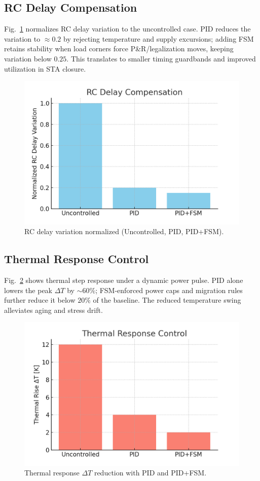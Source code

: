 \documentclass[conference]{IEEEtran}
\begin{document}
\subsection{RC Delay Compensation}
Fig.~\ref{fig:rc} normalizes RC delay variation to the uncontrolled case. PID reduces the variation to $\approx 0.2$ by rejecting temperature and supply excursions; adding FSM retains stability when load corners force P\&R/legalization moves, keeping variation below $0.25$. This translates to smaller timing guardbands and improved utilization in STA closure.

\begin{figure}[t]
\centering
\includegraphics[width=0.95\linewidth]{figs/sim_delay_rc.png}
\caption{RC delay variation normalized (Uncontrolled, PID, PID+FSM).}
\label{fig:rc}
\end{figure}

\subsection{Thermal Response Control}
Fig.~\ref{fig:thermal} shows thermal step response under a dynamic power pulse. PID alone lowers the peak $\Delta T$ by $\sim\!60\%$; FSM-enforced power caps and migration rules further reduce it below $20\%$ of the baseline. The reduced temperature swing alleviates aging and stress drift.

\begin{figure}[t]
\centering
\includegraphics[width=0.95\linewidth]{figs/sim_thermal_response.png}
\caption{Thermal response $\Delta T$ reduction with PID and PID+FSM.}
\label{fig:thermal}
\end{figure}
\end{document}
